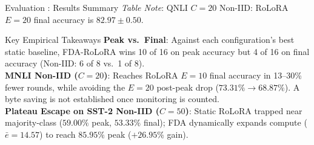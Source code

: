 \documentclass[aspectratio=169]{beamer}
\begin{document}
\begin{frame}[label=main_scorecard]{Evaluation : Results Summary}
    \vspace{0.15em}
    {\tiny \textit{Table Note}: QNLI $C=20$ Non-IID: RoLoRA $E=20$ final accuracy is $82.97 \pm 0.50$.}
    
    \vspace{0.2em}
    \begin{exampleblock}{Key Empirical Takeaways}
        \tiny
        \textbf{Peak vs.\ Final}: Against each configuration's best static baseline, FDA-RoLoRA wins 10 of 16 on peak accuracy but 4 of 16 on final accuracy (Non-IID: 6 of 8 vs.\ 1 of 8).\\
        \textbf{MNLI Non-IID ($C = 20$)}: Reaches RoLoRA $E = 10$ final accuracy in 13--30\% fewer rounds, while avoiding the $E = 20$ post-peak drop ($73.31\% \to 68.87\%$). A byte saving is not established once monitoring is counted.\\
        \textbf{Plateau Escape on SST-2 Non-IID ($C=50$)}: Static RoLoRA trapped near majority-class ($59.00\%$ peak, $53.33\%$ final); FDA dynamically expands compute ($\bar{e}=14.57$) to reach $\mathbf{85.95\%}$ peak ($\mathbf{+26.95\%}$ gain).
    \end{exampleblock}
\end{frame}
\end{document}
